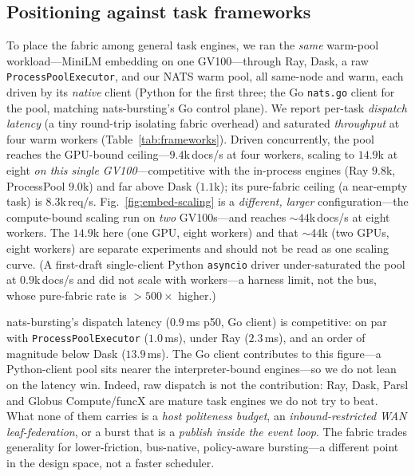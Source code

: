 \documentclass[conference]{IEEEtran}
\begin{document}
\subsection{Positioning against task frameworks}\label{sec:eval-frameworks}
To place the fabric among general task engines, we ran the \emph{same} warm-pool workload---MiniLM
embedding on one GV100---through Ray, Dask, a raw \texttt{ProcessPoolExecutor}, and our NATS warm
pool, all same-node and warm, each driven by its \emph{native} client (Python for the first three;
the Go \texttt{nats.go} client for the pool, matching nats-bursting's Go control plane). We report
per-task \emph{dispatch latency} (a tiny round-trip isolating fabric overhead) and saturated
\emph{throughput} at four warm workers (Table~\ref{tab:frameworks}). Driven concurrently, the pool
reaches the GPU-bound ceiling---$9.4$k\,docs/s at four workers, scaling to $14.9$k at eight
\emph{on this single GV100}---competitive with the in-process engines (Ray $9.8$k, ProcessPool
$9.0$k) and far above Dask ($1.1$k); its pure-fabric ceiling (a near-empty task) is $8.3$k\,req/s.
Fig.~\ref{fig:embed-scaling} is a \emph{different, larger} configuration---the
compute-bound scaling run on \emph{two} GV100s---and reaches ${\sim}44$k\,docs/s at
eight workers. The $14.9$k here (one GPU, eight workers) and that ${\sim}44$k (two
GPUs, eight workers) are separate experiments and should not be read as one scaling
curve. (A first-draft single-client
Python \texttt{asyncio} driver under-saturated the pool at $0.9$k\,docs/s and did not scale with
workers---a harness limit, not the bus, whose pure-fabric rate is ${>}500\times$ higher.)

nats-bursting's dispatch latency ($0.9$\,ms p50, Go client) is competitive: on par with
\texttt{ProcessPoolExecutor} ($1.0$\,ms), under Ray ($2.3$\,ms), and an order of magnitude below Dask
($13.9$\,ms). The Go client contributes to this figure---a Python-client pool sits nearer the
interpreter-bound engines---so we do not lean on the latency win. Indeed, raw dispatch is not the
contribution: Ray, Dask, Parsl and Globus Compute/funcX are
mature task engines we do not try to beat. What none of them carries is a \emph{host politeness budget}, an \emph{inbound-restricted WAN
leaf-federation}, or a burst that is a \emph{publish inside the event loop}. The fabric trades
generality for lower-friction, bus-native, policy-aware bursting---a different point in the design
space, not a faster scheduler.
\end{document}
